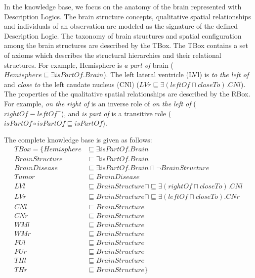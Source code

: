 \documentclass{article}
\begin{document}
In the knowledge base, we focus on the anatomy of the brain represented with Description Logics.
The brain structure concepts, qualitative spatial relationships and individuals of an observation are modeled as the signature of the defined Description Logic.
The taxonomy of brain structures and spatial configuration among the brain structures are described by the TBox.
The TBox contains a set of axioms which describes the structural hierarchies and their relational structures.
For example, 
Hemisphere is \textit{a part of} brain ($Hemisphere \sqsubseteq \exists isPartOf. Brain$).
The left lateral ventricle (LVl) is \textit{to the left of} and \textit{close to} the left caudate nucleus (CNl) ($LVr \sqsubseteq \exists (leftOf \sqcap closeTo). CNl$). 
The properties of the qualitative spatial relationships are described by the RBox.
For example, \textit{on the right of} is an inverse role of \textit{on the left of} ($rightOf \equiv leftOf^-$), and 
\textit{is part of} is a transitive role ($isPartOf \circ isPartOf \sqsubseteq isPartOf$).

The complete knowledge base is given as follows:
\begin{align*}
 TBox=\{ Hemisphere &\sqsubseteq \exists isPartOf. Brain\\
	 BrainStructure &\sqsubseteq \exists isPartOf. Brain\\
	 BrainDisease &\sqsubseteq \exists isPartOf. Brain \sqcap \neg BrainStructure\\
	 Tumor  &\sqsubseteq BrainDisease\\
	 LVl &\sqsubseteq BrainStructure \sqcap \sqsubseteq \exists (rightOf \sqcap closeTo). CNl\\
	 LVr &\sqsubseteq BrainStructure \sqcap \sqsubseteq \exists (leftOf \sqcap closeTo). CNr\\
	 CNl &\sqsubseteq BrainStructure\\
	 CNr &\sqsubseteq BrainStructure\\
	 WMl &\sqsubseteq BrainStructure\\
	 WMr &\sqsubseteq BrainStructure\\
	 PUl &\sqsubseteq BrainStructure\\
	 PUr &\sqsubseteq BrainStructure\\
	 THl &\sqsubseteq BrainStructure\\
	 THr &\sqsubseteq BrainStructure\}
\end{align*}
\end{document}

